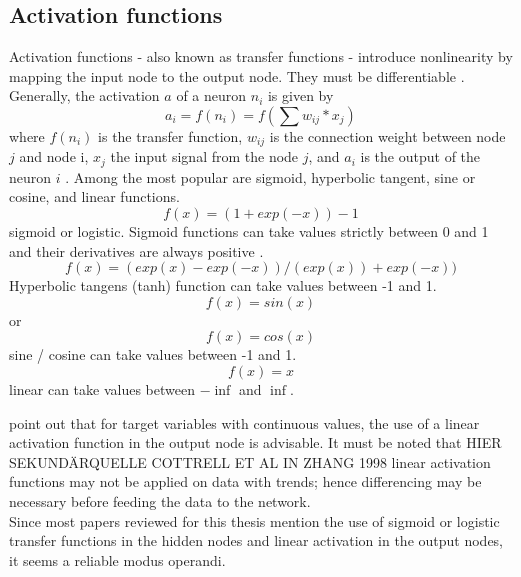 \documentclass[a4paper, 11pt]{article}
\begin{document}
\subsection{Activation functions}
Activation functions - also known as transfer functions - introduce nonlinearity by mapping the input node to the output node\citep{Zhang.1998}. They must be differentiable \citep{Rojas.1996}. \\
Generally, the activation $a$ of a neuron $n_{i}$ is given by
 \begin{equation}
a_{i} = f(n_{i})=f(\sum{w_{ij}*x_{j}})
\end{equation} 
where $f(n_{i})$ is the transfer function, $w_{ij}$ is the connection weight between node $j$ and
node i, $x_{j}$ the input signal from the node $j$, and $a_{i}$ is the output of the neuron $i$ \citep{Benkachcha.2015}.
Among the most popular are sigmoid, hyperbolic tangent, sine or cosine, and linear functions.
\begin{equation}f(x) = (1 + exp(-x))-1\end{equation} sigmoid or logistic. Sigmoid functions can take values strictly between 0 and 1 and their derivatives are always positive \citep{Rojas.1996}.
\begin{equation}f(x) = (exp(x) - exp(-x))/(exp(x)) + exp(-x))\end{equation} Hyperbolic tangens (tanh) function can take values between -1 and 1.
\begin{equation}f(x) = sin(x)\end{equation} or \begin{equation}f(x) = cos(x)\end{equation} sine / cosine can take values between -1 and 1.
\begin{equation}f(x) = x\end{equation} linear can take values between $-\inf$ and $\inf$.

\cite{Zhang.1998} point out that for target variables with continuous values, the use of a linear activation function in the output node is advisable.
It must be noted that HIER SEKUNDÄRQUELLE COTTRELL ET AL IN ZHANG 1998 linear activation functions may not be applied on data with trends; hence differencing may be necessary before feeding the data to the network.\\

Since most papers reviewed for this thesis mention the use of sigmoid or logistic transfer functions in the hidden nodes and linear activation in the output nodes, it seems a reliable modus operandi.
\end{document}
